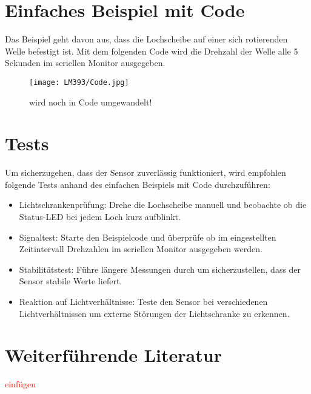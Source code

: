 \section{Einfaches Beispiel mit Code}

Das Beispiel geht davon aus, dass die Lochscheibe auf einer sich rotierenden Welle befestigt ist. Mit dem folgenden Code wird die Drehzahl der Welle alle 5 Sekunden im seriellen Monitor ausgegeben. 

\begin{figure}[H]
	\centering
	\texttt{[image: LM393/Code.jpg]}
	\caption{wird noch in Code umgewandelt!}
	\label{fig:BeispielCodeLM393}
\end{figure}

\section{Tests}

Um sicherzugehen, dass der Sensor zuverlässig funktioniert, wird empfohlen folgende Tests anhand des einfachen Beispiels mit Code durchzuführen:

\begin{itemize}
	\item Lichtschrankenprüfung: Drehe die Lochscheibe manuell und beobachte ob die Status-LED bei jedem Loch kurz aufblinkt.
	\item Signaltest: Starte den Beispielcode und überprüfe ob im eingestellten Zeitintervall Drehzahlen im seriellen Monitor ausgegeben werden.
	\item Stabilitätstest: Führe längere Messungen durch um sicherzustellen, dass der Sensor stabile Werte liefert.
	\item Reaktion auf Lichtverhältnisse: Teste den Sensor bei verschiedenen Lichtverhältnissen um externe Störungen der Lichtschranke zu erkennen.
\end{itemize}

\section{Weiterführende Literatur}

\textcolor{red}{einfügen}

